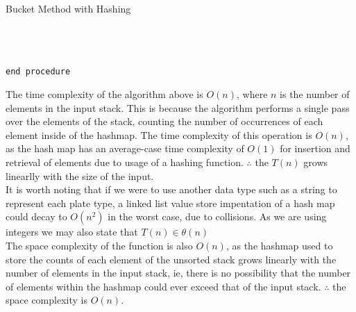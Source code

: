 \documentclass[a4paper]{article}
\begin{document}
\begin{algorithm}
\caption{Bucket Method with Hashing}\label{euclid}
\begin{algorithmic}[1]
 \\

\State{}
\State{}
\State\quad{}
\State\quad{}
\State\quad\quad{}
\State\quad{}
\State{}\\

\State{}
\State\quad{}
\State\quad\quad{}
\State\quad\quad{}
\State\quad{}
\State{} \\
{\tt end procedure}
\EndProcedure
\end{algorithmic}
\end{algorithm}




The time complexity of the algorithm above is $O(n)$,
where $n$ is the number of elements in the input stack. 
This is because the algorithm performs a single pass over the elements of the stack,
counting the number of occurrences of each element inside of the hashmap. 
The time complexity of this operation is $O(n)$, 
as the hash map has an average-case time complexity of $O(1)$ for insertion and retrieval of elements
due to usage of a hashing function.
$\therefore$ the $T(n)$ grows linearlly with the size of the input. \\

It is worth noting that if we were to use another data type such as a string to represent each plate type,
a linked list value store impentation of a hash map could decay to $O(n^2)$ in the worst case, due to collisions.
As we are using integers we may also state that  $T(n) \in \theta (n)$ \\

The space complexity of the function is also $O(n)$,
as the hashmap used to store the counts of each element of the unsorted stack
grows linearly with the number of elements in the input stack,
ie, there is no possibility that the number of elements within the hashmap could ever exceed that of the input stack.
$\therefore$ the space complexity is $O(n)$. \\
\end{document}
